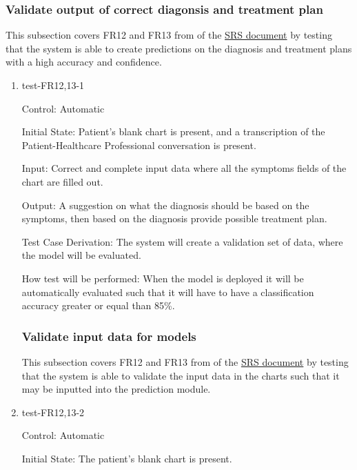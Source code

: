 \documentclass[12pt, titlepage]{article}
\begin{document}
\subsubsection{Validate output of correct diagonsis and treatment plan} \label{section:4.1.6}

This subsection covers FR12 and FR13 from of the \href{https://github.com/Inreet-Kaur/capstone/blob/main/docs/SRS/SRS.pdf} {SRS document} by testing that the system is able to create predictions on the diagnosis and treatment plans with a high accuracy and confidence.

\begin{enumerate}

\item{test-FR12,13-1} \label{test-FR12,13-1}

Control: Automatic

Initial State: Patient's blank chart is present, and a transcription of the Patient-Healthcare Professional conversation is present.

Input: Correct and complete input data where all the symptoms fields of the chart are filled out.

Output: A suggestion on what the diagnosis should be based on the symptoms, then based on the diagnosis provide possible treatment plan.

Test Case Derivation: The system will create a validation set of data, where the model will be evaluated. 

How test will be performed: When the model is deployed it will be automatically evaluated such that it will have to have a classification accuracy greater or equal than 85\%.



\subsubsection{Validate input data for models} \label{section:4.1.7}
This subsection covers FR12 and FR13 from of the \href{https://github.com/Inreet-Kaur/capstone/blob/main/docs/SRS/SRS.pdf} {SRS document} by testing that the system is able to validate the input data in the charts such that it may be inputted into the prediction module.


\item{test-FR12,13-2} \label{test-FR12,13-2}

Control: Automatic

Initial State: The patient's blank chart is present.


\end{enumerate}
\end{document}
